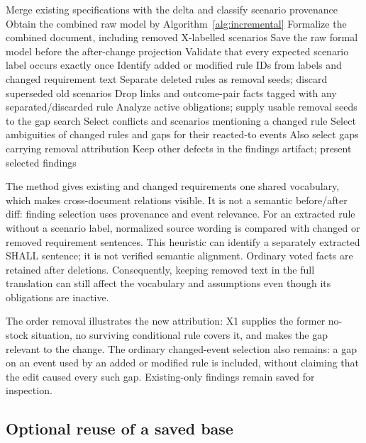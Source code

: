 \begin{algorithm}[H]
\caption{Analyze a change with provenance}\label{alg:change}
\begin{algorithmic}[1]
\State Merge existing specifications with the delta and classify scenario provenance
  \State Obtain the combined raw model by Algorithm~\ref{alg:incremental}
\Else
  \State Formalize the combined document, including removed X-labelled scenarios
\EndIf
\State Save the raw formal model before the after-change projection
\State Validate that every expected scenario label occurs exactly once
\State Identify added or modified rule IDs from labels and changed requirement text
\State Separate deleted rules as removal seeds; discard superseded old scenarios
\State Drop links and outcome-pair facts tagged with any separated/discarded rule
\State Analyze active obligations; supply usable removal seeds to the gap search
\State Select conflicts and scenarios mentioning a changed rule
\State Select ambiguities of changed rules and gaps for their reacted-to events
\State Also select gaps carrying  removal attribution
\State Keep other defects in the findings artifact; present selected findings
\end{algorithmic}
\end{algorithm}

The method gives existing and changed requirements one shared vocabulary,
which makes cross-document relations visible. It is not a semantic
before/after diff: finding selection uses provenance and event relevance.
For an extracted rule without a scenario label, normalized source wording
is compared with changed or removed requirement sentences. This heuristic
can identify a separately extracted SHALL sentence; it is not verified
semantic alignment. Ordinary voted facts are retained after deletions.
Consequently, keeping removed text in the full translation can still affect
the vocabulary and assumptions even though its obligations are inactive.

The order removal illustrates the new attribution: X1 supplies the former
no-stock situation, no surviving conditional rule covers it, and
 makes the gap relevant to the change. The
ordinary changed-event selection also remains: a gap on an event used by
an added or modified rule is included, without claiming that the edit caused
every such gap. Existing-only findings remain saved for inspection.

\subsection{Optional reuse of a saved base}\label{app:incremental}

